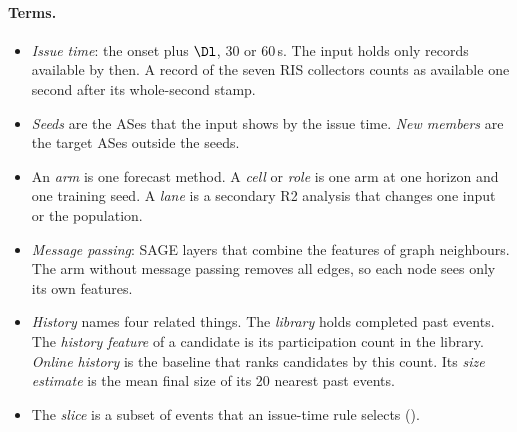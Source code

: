 \paragraph{Terms.}
\begin{itemize}
\item \emph{Issue time}: the onset plus $\Dl$, 30 or 60\,s.
The input holds only records available by then.
A record of the seven RIS collectors counts as available one second after its whole-second stamp.
\item \emph{Seeds} are the ASes that the input shows by the issue time.
\emph{New members} are the target ASes outside the seeds.
\item An \emph{arm} is one forecast method.
A \emph{cell} or \emph{role} is one arm at one horizon and one training seed.
A \emph{lane} is a secondary R2 analysis that changes one input or the population.
\item \emph{Message passing}: SAGE layers that combine the features of graph neighbours.
The arm without message passing removes all edges, so each node sees only its own features.
\item \emph{History} names four related things.
The \emph{library} holds completed past events.
The \emph{history feature} of a candidate is its participation count in the library.
\emph{Online history} is the baseline that ranks candidates by this count.
Its \emph{size estimate} is the mean final size of its 20 nearest past events.
\item The \emph{slice} is a subset of events that an issue-time rule selects ().
\end{itemize}

